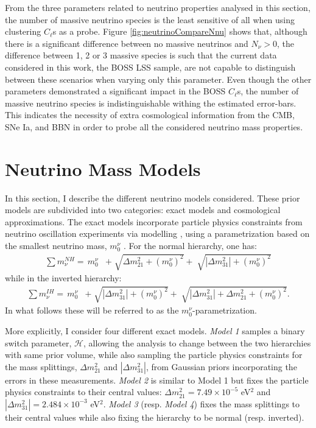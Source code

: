From the three parameters related to neutrino properties analysed in this section, the number of massive neutrino species is the least sensitive of all when using clustering $C_{\ell}$s as a probe. Figure \ref{fig:neutrinoCompareNnu} shows that, although there is a significant difference between no massive neutrinos and $N_{\nu} > 0$, the difference between 1, 2 or 3 massive species is such that the current data considered in this work, the BOSS LSS sample, are not capable to distinguish between these scenarios when varying only this parameter. Even though the other parameters demonstrated a significant impact in the BOSS $C_{\ell}$s, the number of massive neutrino species is indistinguishable withing the estimated error-bars. This indicates the necessity of extra cosmological information from the CMB, SNe Ia, and BBN in order to probe all the considered neutrino mass properties.

\section{Neutrino Mass Models}

In this section, I describe the different neutrino models considered. These prior models are subdivided into two categories: exact models and cosmological approximations. The exact models incorporate particle physics constraints from neutrino oscillation experiments via modelling \NM{}, using a parametrization based on the smallest neutrino mass, $m_0^{\nu}$ \citep{2012Hannestad,2016Hannestad,2018HeavensNeutrino}. For the normal hierarchy, one has:
\begin{align}
    \sum m_{\nu}^{NH} =\,  m^{\nu}_{0} & + \sqrt[]{\Delta m_{21}^2 + (m^{\nu}_{0})^2} + \sqrt[]{|\Delta m_{31}^2| + (m^{\nu}_{0})^2}
\end{align}
\noindent while in the inverted hierarchy: 
\begin{align}
    \sum m_{\nu}^{IH} =\,  m_0^{\nu} & + \sqrt[]{|\Delta m_{31}^2| + (m_0^{\nu})^2} + \sqrt[]{ |\Delta m_{31}^2| + \Delta m_{21}^2 + (m_0^{\nu})^2}.
\end{align} 
In what follows these will be referred to as the $m_0^{\nu}$-parametrization. 

\qquad More explicitly, I consider four different exact models. \textit{Model 1} samples a binary switch parameter, $\mathcal{H}$, allowing the analysis to change between the two hierarchies with same prior volume, while also sampling the particle physics constraints for the mass splittings, $\Delta m_{21}^2$ and $|\Delta m_{31}^2|$, from Gaussian priors incorporating the errors in these measurements. \textit{Model 2} is similar to Model 1 but fixes the particle physics constraints to their central values: $\Delta m_{21}^2 = 7.49\times 10^{-5}$ eV$^2$ and $|\Delta m_{31}^2| = 2.484\times 10^{-3}$ eV$^2$. \textit{Model 3} (resp. \textit{Model 4}) fixes the mass splittings to their central values while also fixing the hierarchy to be normal (resp. inverted).

